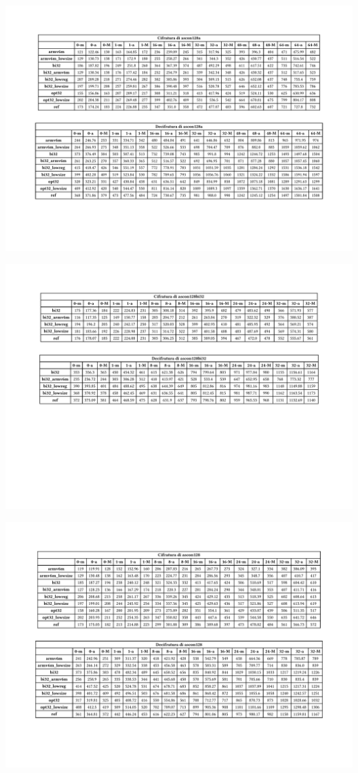 \documentclass{report}
\begin{document}
\includegraphics[width=\textwidth]{adafruit/ascon128a.pdf}

\includegraphics[width=\textwidth]{adafruit/ascon128bi32.pdf}

\includegraphics[width=\textwidth]{adafruit/ascon128.pdf}
\end{document}
